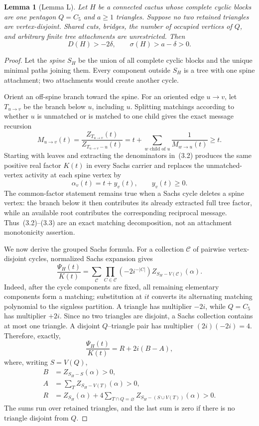 \documentclass[11pt]{article}
\newtheorem{lemma}[theorem]{Lemma}
\theoremstyle{remark}
\newcommand{\sig}{\sigma}
\newcommand{\D}{D}
\begin{document}
\begin{lemma}[Lemma L]\label{lem:L}
Let $H$ be a connected cactus whose complete cyclic blocks are one pentagon
$Q=C_5$ and $a\geq1$ triangles.  Suppose no two retained triangles are
vertex-disjoint.  Shared cuts, bridges, the number of occupied vertices of
$Q$, and arbitrary finite tree attachments are unrestricted.  Then
\[
 \D(H)>-2\delta,
 \qquad
 \sig(H)>a-\delta>0.                                     \tag{L}
\]
\end{lemma}

\begin{proof}
Let the \emph{spine} $S_H$ be the union of all complete cyclic blocks and the
unique minimal paths joining them.  Every component outside $S_H$ is a tree
with one spine attachment; two attachments would create another cycle.

Orient an off-spine branch toward the spine.  For an oriented edge $u\to v$,
let $T_{u\to v}$ be the branch below $u$, including $u$.  Splitting matchings
according to whether $u$ is unmatched or is matched to one child gives the
exact message recursion
\[
 M_{u\to v}(t)=\frac{Z_{T_{u\to v}}(t)}
                     {Z_{T_{u\to v}-u}(t)}
 =t+\sum_{w\text{ child of }u}\frac1{M_{w\to u}(t)}\geq t. \tag{3.2}
\]
Starting with leaves and extracting the denominators in~(3.2) produces the
same positive real factor $K(t)$ in every Sachs carrier and replaces the
unmatched-vertex activity at each spine vertex by
\[
 \alpha_v(t)=t+y_v(t),\qquad y_v(t)\geq0.                 \tag{3.3}
\]
The common-factor statement remains true when a Sachs cycle deletes a spine
vertex: the branch below it then contributes its already extracted full tree
factor, while an available root contributes the corresponding reciprocal
message.  Thus~(3.2)--(3.3) are an exact matching decomposition, not an
attachment monotonicity assertion.

We now derive the grouped Sachs formula.  For a collection $\mathcal C$ of
pairwise vertex-disjoint cycles, normalized Sachs expansion gives
\[
 \frac{\Psi_H(t)}{K(t)}
 =\sum_{\mathcal C}\prod_{C\in\mathcal C}(-2i^{-|C|})
     Z_{S_H-V(\mathcal C)}(\alpha).                       \tag{3.4}
\]
Indeed, after the cycle components are fixed, all remaining elementary
components form a matching; substitution at $it$ converts its alternating
matching polynomial to the signless partition.  A triangle has multiplier
$-2i$, while $Q=C_5$ has multiplier $+2i$.  Since no two triangles are
disjoint, a Sachs collection contains at most one triangle.  A disjoint
$Q$--triangle pair has multiplier $(2i)(-2i)=4$.  Therefore, exactly,
\[
 \frac{\Psi_H(t)}{K(t)}=R+2i(B-A),                        \tag{3.5}
\]
where, writing $S=V(Q)$,
\begin{align*}
 B&=Z_{S_H-S}(\alpha)>0,\\
 A&=\sum_T Z_{S_H-V(T)}(\alpha)>0,\\
 R&=Z_{S_H}(\alpha)
   +4\sum_{T\cap Q=\varnothing}
       Z_{S_H-(S\cup V(T))}(\alpha)>0.                   \tag{3.6}
\end{align*}
The sums run over retained triangles, and the last sum is zero if there is no
triangle disjoint from $Q$.


\end{proof}
\end{document}
